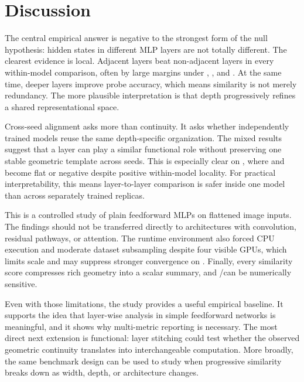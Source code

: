\section{Discussion}
\label{sec:discussion}

 The central empirical answer is negative to the strongest form of the null hypothesis: hidden states in different MLP layers are not totally different. The clearest evidence is local. Adjacent layers beat non-adjacent layers in every within-model comparison, often by large margins under \cka, \svcca, and \pwcca. At the same time, deeper layers improve probe accuracy, which means similarity is not merely redundancy. The more plausible interpretation is that depth progressively refines a shared representational space.

 Cross-seed alignment asks more than continuity. It asks whether independently trained models reuse the same depth-specific organization. The mixed results suggest that a layer can play a similar functional role without preserving one stable geometric template across seeds. This is especially clear on \cifar, where \pwcca and \svcca become flat or negative despite positive within-model locality. For practical interpretability, this means layer-to-layer comparison is safer inside one model than across separately trained replicas.

 This is a controlled study of plain feedforward MLPs on flattened image inputs. The findings should not be transferred directly to architectures with convolution, residual pathways, or attention. The runtime environment also forced CPU execution and moderate dataset subsampling despite four visible GPUs, which limits scale and may suppress stronger convergence on \cifar. Finally, every similarity score compresses rich geometry into a scalar summary, and \svcca/\pwcca can be numerically sensitive.

 Even with those limitations, the study provides a useful empirical baseline. It supports the idea that layer-wise analysis in simple feedforward networks is meaningful, and it shows why multi-metric reporting is necessary. The most direct next extension is functional: layer stitching could test whether the observed geometric continuity translates into interchangeable computation. More broadly, the same benchmark design can be used to study when progressive similarity breaks down as width, depth, or architecture changes.
